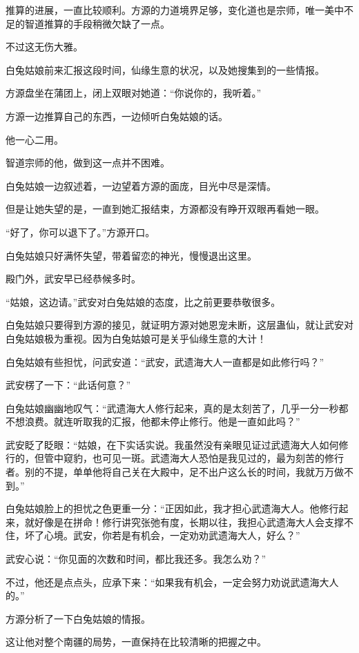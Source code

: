 \begin{this_body}
推算的进展，一直比较顺利。方源的力道境界足够，变化道也是宗师，唯一美中不足的智道推算的手段稍微欠缺了一点。

不过这无伤大雅。

白兔姑娘前来汇报这段时间，仙缘生意的状况，以及她搜集到的一些情报。

方源盘坐在蒲团上，闭上双眼对她道：“你说你的，我听着。”

方源一边推算自己的东西，一边倾听白兔姑娘的话。

他一心二用。

智道宗师的他，做到这一点并不困难。

白兔姑娘一边叙述着，一边望着方源的面庞，目光中尽是深情。

但是让她失望的是，一直到她汇报结束，方源都没有睁开双眼再看她一眼。

“好了，你可以退下了。”方源开口。

白兔姑娘只好满怀失望，带着留恋的神光，慢慢退出这里。

殿门外，武安早已经恭候多时。

“姑娘，这边请。”武安对白兔姑娘的态度，比之前更要恭敬很多。

白兔姑娘只要得到方源的接见，就证明方源对她恩宠未断，这层蛊仙，就让武安对白兔姑娘极为重视。因为白兔姑娘可是关乎仙缘生意的大计！

白兔姑娘有些担忧，问武安道：“武安，武遗海大人一直都是如此修行吗？”

武安楞了一下：“此话何意？”

白兔姑娘幽幽地叹气：“武遗海大人修行起来，真的是太刻苦了，几乎一分一秒都不想浪费。就连听取我的汇报，他都未停止修行。他是一直如此吗？”

武安眨了眨眼：“姑娘，在下实话实说。我虽然没有亲眼见证过武遗海大人如何修行的，但管中窥豹，也可见一斑。武遗海大人恐怕是我见过的，最为刻苦的修行者。别的不提，单单他将自己关在大殿中，足不出户这么长的时间，我就万万做不到。”

白兔姑娘脸上的担忧之色更重一分：“正因如此，我才担心武遗海大人。他修行起来，就好像是在拼命！修行讲究张弛有度，长期以往，我担心武遗海大人会支撑不住，坏了心境。武安，你若是有机会，一定劝劝武遗海大人，好么？”

武安心说：“你见面的次数和时间，都比我还多。我怎么劝？”

不过，他还是点点头，应承下来：“如果我有机会，一定会努力劝说武遗海大人的。”

方源分析了一下白兔姑娘的情报。

这让他对整个南疆的局势，一直保持在比较清晰的把握之中。


\end{this_body}
